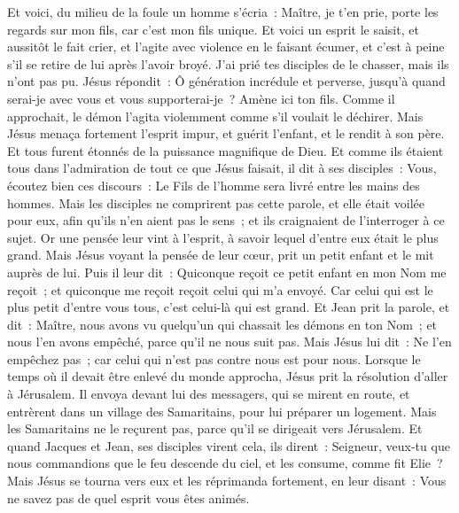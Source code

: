 \begin{multicols}{2}
Et voici, du milieu de la foule un homme s'écria~: Maître, je t'en prie, porte les regards sur mon fils, car c'est mon fils unique.
Et voici un esprit le saisit, et aussitôt le fait crier, et l'agite avec violence en le faisant écumer, et c'est à peine s'il se retire de lui après l'avoir broyé.
J'ai prié tes disciples de le chasser, mais ils n'ont pas pu.
Jésus répondit~: Ô génération incrédule et perverse, jusqu'à quand serai-je avec vous et vous supporterai-je~? Amène ici ton fils.
Comme il approchait, le démon l'agita violemment comme s'il voulait le déchirer. Mais Jésus menaça fortement l'esprit impur, et guérit l'enfant, et le rendit à son père.
Et tous furent étonnés de la puissance magnifique de Dieu. Et comme ils étaient tous dans l'admiration de tout ce que Jésus faisait, il dit à ses disciples~:
Vous, écoutez bien ces discours~: Le Fils de l'homme sera livré entre les mains des hommes.
Mais les disciples ne comprirent pas cette parole, et elle était voilée pour eux, afin qu'ils n'en aient pas le sens~; et ils craignaient de l'interroger à ce sujet.
Or une pensée leur vint à l'esprit, à savoir lequel d'entre eux était le plus grand.
Mais Jésus voyant la pensée de leur cœur, prit un petit enfant et le mit auprès de lui.
Puis il leur dit~: Quiconque reçoit ce petit enfant en mon Nom me reçoit~; et quiconque me reçoit reçoit celui qui m'a envoyé. Car celui qui est le plus petit d'entre vous tous, c'est celui-là qui est grand.
Et Jean prit la parole, et dit~: Maître, nous avons vu quelqu'un qui chassait les démons en ton Nom~; et nous l'en avons empêché, parce qu'il ne nous suit pas.
Mais Jésus lui dit~: Ne l'en empêchez pas~; car celui qui n'est pas contre nous est pour nous.
Lorsque le temps où il devait être enlevé du monde approcha, Jésus prit la résolution d'aller à Jérusalem.
Il envoya devant lui des messagers, qui se mirent en route, et entrèrent dans un village des Samaritains, pour lui préparer un logement.
Mais les Samaritains ne le reçurent pas, parce qu'il se dirigeait vers Jérusalem.
Et quand Jacques et Jean, ses disciples virent cela, ils dirent~: Seigneur, veux-tu que nous commandions que le feu descende du ciel, et les consume, comme fit Elie~?
Mais Jésus se tourna vers eux et les réprimanda fortement, en leur disant~: Vous ne savez pas de quel esprit vous êtes animés.

\end{multicols}
